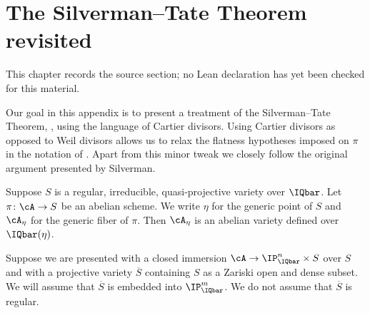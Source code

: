 \chapter{The Silverman--Tate Theorem revisited}
\label{uniformity-mordell-lang-curves-chapter-09}

\begin{remark}
\label{uniformity-mordell-lang-curves-chapter-09-source}
This chapter records the source section; no Lean declaration has yet been checked for this material.
\notready
\end{remark}

\label{app:silvermantate}

Our goal in this appendix is to present a treatment of the
Silverman--Tate Theorem, \cite[Theorem~A]{Silverman}, using the language
of Cartier divisors. Using Cartier divisors as opposed to Weil
divisors  allows us to relax the flatness
hypotheses imposed on $\pi$ in the notation of \cite[$\mathsection$3]{Silverman}. Apart from this minor tweak
we closely follow the original argument presented by Silverman.

Suppose $S$ is a {regular},
{irreducible}, {quasi-projective} variety over $\IQbar$.
Let $\pi \colon \cA\rightarrow S$ be an abelian scheme.
We write $\eta$ for the generic point of $S$ and $\cA_\eta$ for the
generic fiber of $\pi$. Then $\cA_\eta$ is an abelian variety defined
over $\IQbar(\eta)$.

Suppose we are presented with a closed immersion
$\cA\rightarrow \IP_{\IQbar}^n\times S$ over $S$ and
 with a projective variety $\overline S$
containing $S$ as a Zariski open and dense subset.
We will assume that $\overline S$ is embedded into $\IP_\IQbar^m$.
We do not assume that $\overline S$ is regular. %

